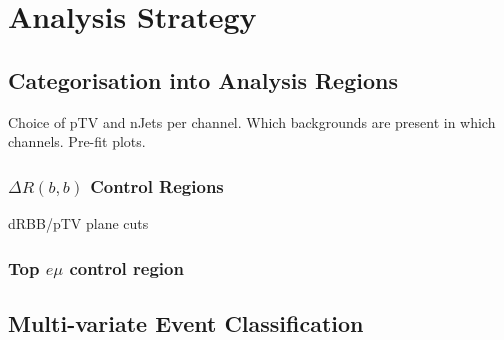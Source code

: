 \chapter{Analysis Strategy}%
\label{ch:strategy}
\section{Categorisation into Analysis Regions}
\label{sec:ana-regions}
Choice of pTV and nJets per channel.
Which backgrounds are present in which channels.
Pre-fit plots.
\subsection{\texorpdfstring{$\Delta R(b,b)$}{DRbb} Control Regions}%
\label{sec:control-region-defintions}
dRBB/pTV plane cuts






\subsection{Top \texorpdfstring{$e \mu$}{e mu} control region}%
\label{sec:topemucr}
\section{Multi-variate Event Classification}%
\label{sec:mva}




